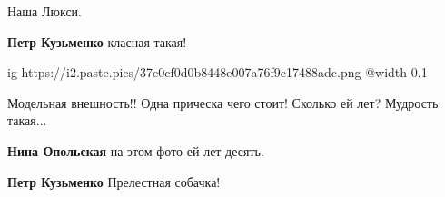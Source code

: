  
 
 
 
 

Наша Люкси.

\textbf{Петр Кузьменко} класная такая!


\ifcmt
  ig https://i2.paste.pics/37e0cf0d0b8448e007a76f9c17488adc.png
  @width 0.1
\fi

Модельная внешность!! Одна прическа чего стоит! Сколько ей лет? Мудрость такая...

\textbf{Нина Опольская} на этом фото ей лет десять.

\textbf{Петр Кузьменко} Прелестная собачка!
